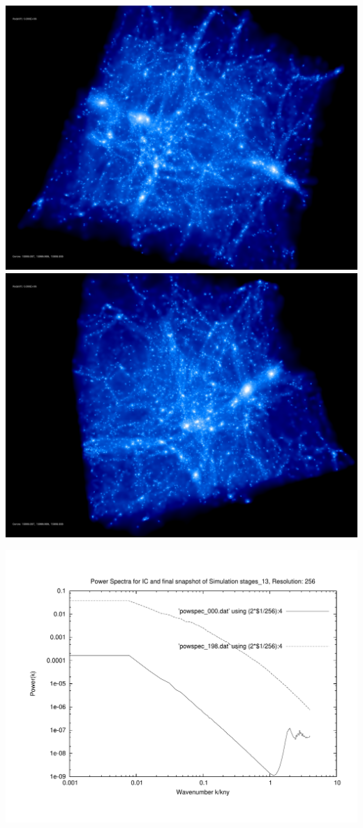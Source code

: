 \includegraphics[scale=0.1]{r256/stages_13/rotate_00074.jpg} 
\includegraphics[scale=0.1]{r256/stages_13/rotate_00131.jpg}

\includegraphics[scale=0.5]{r256/stages_13/plot_powspec_stages_13}


